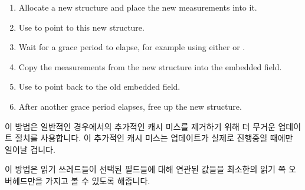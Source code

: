 {\begin{enumerate}
	\item	Allocate a new  structure and place
		the new measurements into it.
	\item	Use  to point  to
		this new structure.
	\item	Wait for a grace period to elapse, for example using
		either  or .
	\item	Copy the measurements from the new 
		structure into the embedded  field.
	\item	Use  to point 
		back to the old embedded  field.
	\item	After another grace period elapses, free up the
		new  structure.
	\fi
	\end{enumerate}

	이 방법은 일반적인 경우에서의 추가적인 캐시 미스를 제거하기 위해 더
	무거운 업데이트 절치를 사용합니다.
	이 추가적인 캐시 미스는 업데이트가 실제로 진행중일 때에만 일어날
	겁니다.
	\iffalse

	This approach uses a heavier weight update procedure to eliminate
	the extra cache miss in the common case.
	The extra cache miss will be incurred only while an update is
	actually in progress.
	\fi
} \QuickQuizEnd

이 방법은 읽기 쓰레드들이 선택된 필드들에 대해 연관된 값들을 최소한의 읽기 쪽
오버헤드만을 가지고 볼 수 있도록 해줍니다.
\iffalse

This approach enables readers to see correlated values for selected
fields with minimal read-side overhead.
\fi


